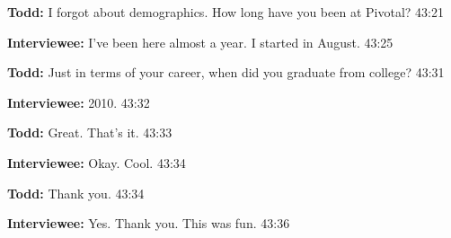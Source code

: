 \textbf{Todd:} I forgot about demographics. How long have you been at Pivotal? 43:21

\textbf{Interviewee:} I've been here almost a year. I started in August. 43:25

\textbf{Todd:} Just in terms of your career, when did you graduate from college? 43:31

\textbf{Interviewee:} 2010. 43:32

\textbf{Todd:} Great. That's it. 43:33

\textbf{Interviewee:} Okay. Cool. 43:34

\textbf{Todd:} Thank you. 43:34

\textbf{Interviewee:} Yes. Thank you. This was fun. 43:36

